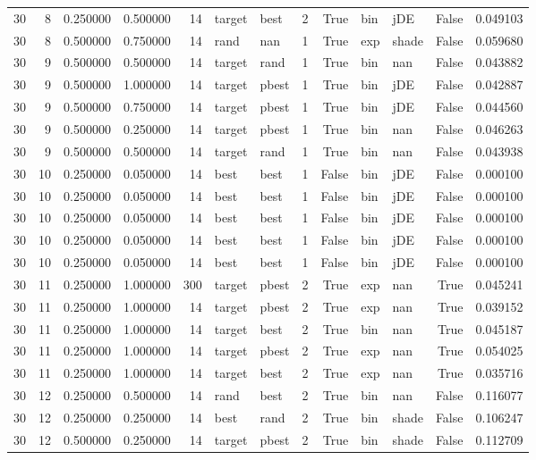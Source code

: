 \begin{tabular}{rrrrrllrrllrr}
30 & 8 & 0.250000 & 0.500000 & 14 & target & best & 2 & True & bin & jDE & False & 0.049103 \\
30 & 8 & 0.500000 & 0.750000 & 14 & rand & nan & 1 & True & exp & shade & False & 0.059680 \\
30 & 9 & 0.500000 & 0.500000 & 14 & target & rand & 1 & True & bin & nan & False & 0.043882 \\
30 & 9 & 0.500000 & 1.000000 & 14 & target & pbest & 1 & True & bin & jDE & False & 0.042887 \\
30 & 9 & 0.500000 & 0.750000 & 14 & target & pbest & 1 & True & bin & jDE & False & 0.044560 \\
30 & 9 & 0.500000 & 0.250000 & 14 & target & pbest & 1 & True & bin & nan & False & 0.046263 \\
30 & 9 & 0.500000 & 0.500000 & 14 & target & rand & 1 & True & bin & nan & False & 0.043938 \\
30 & 10 & 0.250000 & 0.050000 & 14 & best & best & 1 & False & bin & jDE & False & 0.000100 \\
30 & 10 & 0.250000 & 0.050000 & 14 & best & best & 1 & False & bin & jDE & False & 0.000100 \\
30 & 10 & 0.250000 & 0.050000 & 14 & best & best & 1 & False & bin & jDE & False & 0.000100 \\
30 & 10 & 0.250000 & 0.050000 & 14 & best & best & 1 & False & bin & jDE & False & 0.000100 \\
30 & 10 & 0.250000 & 0.050000 & 14 & best & best & 1 & False & bin & jDE & False & 0.000100 \\
30 & 11 & 0.250000 & 1.000000 & 300 & target & pbest & 2 & True & exp & nan & True & 0.045241 \\
30 & 11 & 0.250000 & 1.000000 & 14 & target & pbest & 2 & True & exp & nan & True & 0.039152 \\
30 & 11 & 0.250000 & 1.000000 & 14 & target & best & 2 & True & bin & nan & True & 0.045187 \\
30 & 11 & 0.250000 & 1.000000 & 14 & target & pbest & 2 & True & exp & nan & True & 0.054025 \\
30 & 11 & 0.250000 & 1.000000 & 14 & target & best & 2 & True & exp & nan & True & 0.035716 \\
30 & 12 & 0.250000 & 0.500000 & 14 & rand & best & 2 & True & bin & nan & False & 0.116077 \\
30 & 12 & 0.250000 & 0.250000 & 14 & best & rand & 2 & True & bin & shade & False & 0.106247 \\
30 & 12 & 0.500000 & 0.250000 & 14 & target & pbest & 2 & True & bin & shade & False & 0.112709 \\

\end{tabular}
